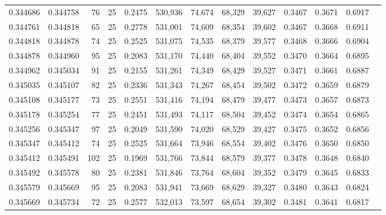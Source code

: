 \begin{tabular}{rrrrrrrrrrrrr}
0.344686 & 0.344758 &    76 &  25 &                                     0.2475 & 530,936 &  74,674 &  68,329 &  39,627 & 0.3467 & 0.3671 & 0.6917 \\
0.344761 & 0.344818 &    65 &  25 &                                     0.2778 & 531,001 &  74,609 &  68,354 &  39,602 & 0.3467 & 0.3668 & 0.6911 \\
0.344818 & 0.344878 &    74 &  25 &                                     0.2525 & 531,075 &  74,535 &  68,379 &  39,577 & 0.3468 & 0.3666 & 0.6904 \\
0.344878 & 0.344960 &    95 &  25 &                                     0.2083 & 531,170 &  74,440 &  68,404 &  39,552 & 0.3470 & 0.3664 & 0.6895 \\
0.344962 & 0.345034 &    91 &  25 &                                     0.2155 & 531,261 &  74,349 &  68,429 &  39,527 & 0.3471 & 0.3661 & 0.6887 \\
0.345035 & 0.345107 &    82 &  25 &                                     0.2336 & 531,343 &  74,267 &  68,454 &  39,502 & 0.3472 & 0.3659 & 0.6879 \\
0.345108 & 0.345177 &    73 &  25 &                                     0.2551 & 531,416 &  74,194 &  68,479 &  39,477 & 0.3473 & 0.3657 & 0.6873 \\
0.345178 & 0.345254 &    77 &  25 &                                     0.2451 & 531,493 &  74,117 &  68,504 &  39,452 & 0.3474 & 0.3654 & 0.6865 \\
0.345256 & 0.345347 &    97 &  25 &                                     0.2049 & 531,590 &  74,020 &  68,529 &  39,427 & 0.3475 & 0.3652 & 0.6856 \\
0.345347 & 0.345412 &    74 &  25 &                                     0.2525 & 531,664 &  73,946 &  68,554 &  39,402 & 0.3476 & 0.3650 & 0.6850 \\
0.345412 & 0.345491 &   102 &  25 &                                     0.1969 & 531,766 &  73,844 &  68,579 &  39,377 & 0.3478 & 0.3648 & 0.6840 \\
0.345492 & 0.345578 &    80 &  25 &                                     0.2381 & 531,846 &  73,764 &  68,604 &  39,352 & 0.3479 & 0.3645 & 0.6833 \\
0.345579 & 0.345669 &    95 &  25 &                                     0.2083 & 531,941 &  73,669 &  68,629 &  39,327 & 0.3480 & 0.3643 & 0.6824 \\
0.345669 & 0.345734 &    72 &  25 &                                     0.2577 & 532,013 &  73,597 &  68,654 &  39,302 & 0.3481 & 0.3641 & 0.6817 \\

\end{tabular}
